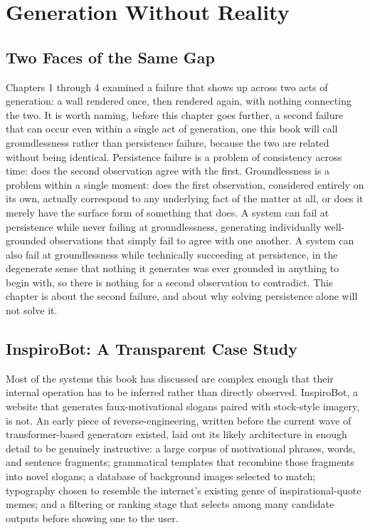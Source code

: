 \chapter{Generation Without Reality}

\section{Two Faces of the Same Gap}

Chapters 1 through 4 examined a failure that shows up across two acts of generation: a wall rendered once, then rendered again, with nothing connecting the two. It is worth naming, before this chapter goes further, a second failure that can occur even within a single act of generation, one this book will call groundlessness rather than persistence failure, because the two are related without being identical. Persistence failure is a problem of consistency across time: does the second observation agree with the first. Groundlessness is a problem within a single moment: does the first observation, considered entirely on its own, actually correspond to any underlying fact of the matter at all, or does it merely have the surface form of something that does. A system can fail at persistence while never failing at groundlessness, generating individually well-grounded observations that simply fail to agree with one another. A system can also fail at groundlessness while technically succeeding at persistence, in the degenerate sense that nothing it generates was ever grounded in anything to begin with, so there is nothing for a second observation to contradict. This chapter is about the second failure, and about why solving persistence alone will not solve it.

\section{InspiroBot: A Transparent Case Study}

Most of the systems this book has discussed are complex enough that their internal operation has to be inferred rather than directly observed. InspiroBot, a website that generates faux-motivational slogans paired with stock-style imagery, is not. An early piece of reverse-engineering, written before the current wave of transformer-based generators existed, laid out its likely architecture in enough detail to be genuinely instructive: a large corpus of motivational phrases, words, and sentence fragments; grammatical templates that recombine those fragments into novel slogans; a database of background images selected to match; typography chosen to resemble the internet's existing genre of inspirational-quote memes; and a filtering or ranking stage that selects among many candidate outputs before showing one to the user.

